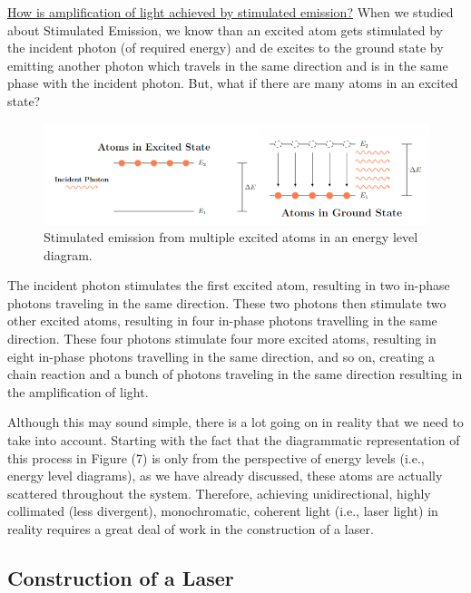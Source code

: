 \documentclass[12pt]{article}
\begin{document}
\uline{How is amplification of light achieved by stimulated emission?} When we studied about Stimulated Emission, we know than an excited atom gets stimulated by the incident photon (of required energy) and de excites to the ground state by emitting another photon which travels in the same direction and is in the same phase with the incident photon. But, what if there are many atoms in an excited state?

\begin{figure}[H]
    \centering
    \includegraphics[scale=.78]{./img/07_amplification.png}
    \caption{Stimulated emission from multiple excited atoms in an energy level diagram.}
\end{figure}

The incident photon stimulates the first excited atom, resulting in two in-phase photons traveling in the same direction. These two photons then stimulate two other excited atoms, resulting in four in-phase photons travelling in the same direction. These four photons stimulate four more excited atoms, resulting in eight in-phase photons travelling in the same direction, and so on, creating a chain reaction and a bunch of photons traveling in the same direction resulting in the amplification of light. \vspace{.3cm}

Although this may sound simple, there is a lot going on in reality that we need to take into account. Starting with the fact that the diagrammatic representation of this process in Figure (7) is only from the perspective of energy levels (i.e., energy level diagrams), as we have already discussed, these atoms are actually scattered throughout the system. Therefore, achieving unidirectional, highly collimated (less divergent), monochromatic, coherent light (i.e., laser light) in reality requires a great deal of work in the construction of a laser.

\subsection{Construction of a Laser}
\end{document}
